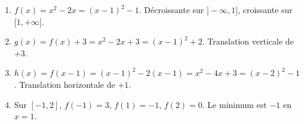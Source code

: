 \begin{enumerate}[label=\arabic*)]
\item $f(x)=x^2-2x=(x-1)^2-1$. Décroissante sur $]-\infty,1]$, croissante sur $[1,+\infty[$.
\item $g(x)=f(x)+3=x^2-2x+3=(x-1)^2+2$. Translation verticale de $+3$.
\item $h(x)=f(x-1)=(x-1)^2-2(x-1)=x^2-4x+3=(x-2)^2-1$. Translation horizontale de $+1$.
\item Sur $[-1,2]$, $f(-1)=3$, $f(1)=-1$, $f(2)=0$. Le minimum est $-1$ en $x=1$.
\end{enumerate}